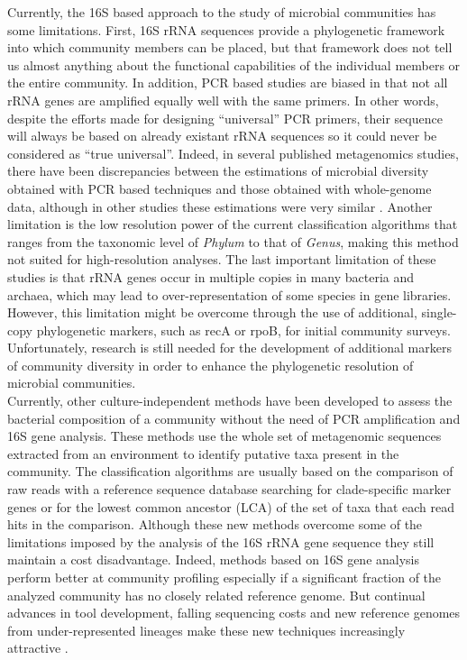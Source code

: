 Currently, the 16S based approach to the study of microbial communities has some limitations. First, 16S rRNA sequences provide a phylogenetic framework into which community members can be placed, but that framework does not tell us almost anything about the functional capabilities of the individual members or the entire community. In addition, PCR based studies are biased in that not all rRNA genes are amplified equally well with the same primers. In other words, despite the efforts made for designing ``universal'' PCR primers, their sequence will always be based on already existant rRNA sequences so it could never be considered as ``true universal''. Indeed, in several published metagenomics studies, there have been discrepancies between the estimations of microbial diversity obtained with PCR based techniques and those obtained with whole-genome data, although in other studies these estimations were very similar \cite{liles2003census, tyson2004community}. Another limitation is the low resolution power of the current classification algorithms that ranges from the taxonomic level of \textit{Phylum} to that of \textit{Genus}, making this method not suited for high-resolution analyses. The last important limitation of these studies is that rRNA genes occur in multiple copies in many bacteria and archaea, which may lead to over-representation of some species in gene libraries. However, this limitation might be overcome through the use of additional, single-copy phylogenetic markers, such as recA or rpoB, for initial community surveys. Unfortunately, research is still needed for the development of additional markers of community diversity in order to enhance the phylogenetic resolution of microbial communities.\\
Currently, other culture-independent methods have been developed to assess the bacterial composition of a community without the need of PCR amplification and 16S gene analysis. These methods use the whole set of metagenomic sequences extracted from an environment to identify putative taxa present in the community. The classification algorithms are usually based on the comparison of raw reads with a reference sequence database searching for clade-specific marker genes \cite{segata2012metagenomic} or for the lowest common ancestor (LCA) \cite{huson2007megan} of the set of taxa that each read hits in the comparison. Although these new methods overcome some of the limitations imposed by the analysis of the 16S rRNA gene sequence they still maintain a cost disadvantage. Indeed, methods based on 16S gene analysis perform better at community profiling especially if a significant fraction of the analyzed community has no closely related reference genome. But continual advances in tool development, falling sequencing costs and new reference genomes from under-represented lineages make these new techniques increasingly attractive \cite{haft2012high}.\\


